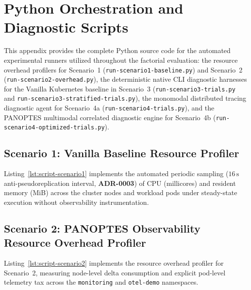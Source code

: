 \chapter{Python Orchestration and Diagnostic Scripts}
\label{app:python-scripts}

This appendix provides the complete Python source code for the automated experimental runners utilized throughout the factorial evaluation: the resource overhead profilers for Scenario~1 (\texttt{run-scenario1-baseline.py}) and Scenario~2 (\texttt{run-scenario2-overhead.py}), the deterministic native CLI diagnostic harnesses for the Vanilla Kubernetes baseline in Scenario~3 (\texttt{run-scenario3-trials.py} and \texttt{run-scenario3-stratified-trials.py}), the monomodal distributed tracing diagnostic agent for Scenario~4a (\texttt{run-scenario4-trials.py}), and the PANOPTES multimodal correlated diagnostic engine for Scenario~4b (\texttt{run-scenario4-optimized-trials.py}).

\section{Scenario 1: Vanilla Baseline Resource Profiler}
\label{sec:app-script-scenario1}

Listing~\ref{lst:script-scenario1} implements the automated periodic sampling ($16\,\text{s}$ anti-pseudoreplication interval, \textbf{ADR-0003}) of CPU (millicores) and resident memory (MiB) across the cluster nodes and workload pods under steady-state execution without observability instrumentation.



\section{Scenario 2: PANOPTES Observability Resource Overhead Profiler}
\label{sec:app-script-scenario2}

Listing~\ref{lst:script-scenario2} implements the resource overhead profiler for Scenario~2, measuring node-level delta consumption and explicit pod-level telemetry tax across the \texttt{monitoring} and \texttt{otel-demo} namespaces.

